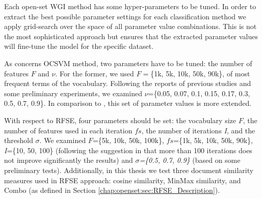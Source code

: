 Each open-set WGI method has some hyper-parameters to be tuned. In order to extract the best possible parameter settings for each classification method we apply grid-search over the space of all parameter value combinations. This is not the most sophisticated approach but ensures that the extracted parameter values will fine-tune the model for the specific dataset.

As concerns OCSVM method, two parameters have to be tuned: the number of features $F$ and $\nu$. For the former, we used $F=$\{1k, 5k, 10k, 50k, 90k\}, of most frequent terms of the vocabulary. Following the reports of previous studies \parencite{scholkopf1999estimating} and some preliminary experiments, we examined $\nu$=\{0.05, 0.07, 0.1, 0.15, 0.17, 0.3, 0.5, 0.7, 0.9\}. In comparison to \parencite{pritsos2013open}, this set of parameter values is more extended. 

With respect to RFSE, four parameters should be set: the vocabulary size $F$, the number of features used in each iteration $fs$, the number of iterations \textit{I}, and the threshold $\sigma$. We examined $F$=\{5k, 10k, 50k, 100k\}, $fs$=\{1k, 5k, 10k, 50k, 90k\}, \textit{I}=\{10, 50, 100\} (following the suggestion in \parencite{koppel2011authorship} that more than 100 iterations does not improve significantly the results) and $\sigma$\textit{=\{0.5, 0.7, 0.9\}} (based on some preliminary tests). Additionally, in this thesis we test three document similarity measures used in RFSE approach: cosine similarity, MinMax similarity, and Combo (as defined in Section \ref{chap:openset:sec:RFSE_Description}). 



